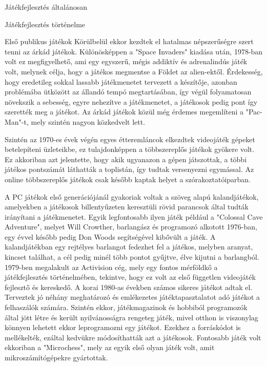 \begin{MyChapter}{Játékfejlesztés általánosan}
\begin{MySection}{Játékfejlesztés történelme}
\begin{MySubSection}{Első publikus játékok}
			Körülbelül ekkor kezdtek el hatalmas népszerűségre szert tenni az árkád játékok. Különösképpen a "Space Invaders" kiadása után, 1978-ban volt ez megfigyelhető, ami egy egyszerű, mégis addiktív és adrenalindús játék volt, melynek célja, hogy a játékos megmentse a Földet az alien-ektől. Érdekesség, hogy eredetileg sokkal lassabb játékmenetet tervezett a készítője, azonban problémába ütközött az állandó tempó megtartásában, így végül folyamatosan növekszik a sebesség, egyre nehezítve a játékmenetet, a játékosok pedig pont így szerették meg a játékot. Az árkád játékok közül még érdemes megemlíteni a "Pac-Man"-t, mely szintén nagyon közkedvelt lett.
			\cite{arcade}
						
			Szintén az 1970-es évek végén egyes étteremláncok elkezdtek videojáték gépeket betelepíteni üzleteikbe, ez tulajdonképpen a többszereplős játékok gyökere volt. Ez akkoriban azt jelentette, hogy akik ugyanazon a gépen játszottak, a többi játékos pontszámát láthatták a toplistán, így tudtak versenyezni egymással. Az online többszereplős játékok csak később kaptak helyet a szórakoztatóiparban.
			
			A PC játékok első generációjánál gyakoriak voltak a szöveg alapú kalandjátékok, amelyekben a játékosok billentyűzeten keresztüli rövid parancsok által tudták irányítani a játékmenetet. Egyik legfontosabb ilyen játék például a "Colossal Cave Adventure", melyet Will Crowther, barlangász és programozó alkotott 1976-ban, egy évvel később pedig Don Woods segítségével kibővült a játék. A kalandjátékban egy rejtélyes barlangot fedezhet fel a játékos, melyben aranyat, kincset találhat, a cél pedig minél több pontot gyűjtve, élve kijutni a barlangból.
			\cite{colossal_cave_adventure}
			1979-ben megalakult az Activision cég, mely egy fontos mérföldkő a játékfejlesztés történelmében, tekintve, hogy ez volt az első független videojáték fejlesztő és kereskedő. A korai 1980-as években számos sikeres játékot adtak el. Terveztek jó néhány meghatározó és emlékezetes játéktapasztalatot adó játékot a felhaszálók számára.
			\cite{activision_wiki}
			\cite{activision_aboutus}
			Szintén ekkor, játékmagazinok és hobbiból programozók által jött létre és került nyilvánosságra rengeteg játék, mivel otthon is viszonylag könnyen lehetett ekkor leprogramozni egy játékot. Ezekhez a forráskódot is mellékelték, ezáltal kedvükre módosíthatták azt a játékosok. Fontosabb játék volt ekkoriban a "Microchess", mely az egyik első olyan játék volt, amit mikroszámítógépekre gyártottak.
		\end{MySubSection}
		

\end{MySection}
\end{MyChapter}
